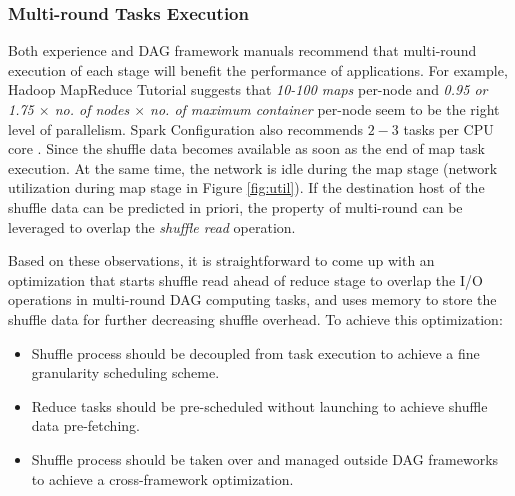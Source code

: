 \subsubsection{Multi-round Tasks Execution}\label{multi}
Both experience and DAG framework manuals recommend that multi-round execution of each stage will benefit the performance of applications.
For example, Hadoop MapReduce Tutorial \cite{hadooptutorial} suggests that \textit{10-100 maps} per-node and \textit{0.95 or 1.75 $\times$ no. of nodes $\times$ no. of maximum container} per-node seem to be the right level of parallelism. Spark Configuration also recommends $2-3$ tasks per CPU core \cite{sparkconf}.
Since the shuffle data becomes available as soon as the end of map task execution. At the same time, the network is idle during the map stage (network utilization during map stage in Figure \ref{fig:util}). If the destination host of the shuffle data can be predicted in priori, the property of multi-round can be leveraged to overlap the \textit{shuffle read} operation.

Based on these observations, it is straightforward to come up with an optimization that starts shuffle read ahead of reduce stage to overlap the I/O operations in multi-round DAG computing tasks, and uses memory to store the shuffle data for further decreasing shuffle overhead. To achieve this optimization:
\begin{itemize}
	\item Shuffle process should be decoupled from task execution to achieve a fine granularity scheduling scheme.
	\item Reduce tasks should be pre-scheduled without launching to achieve shuffle data pre-fetching.
	\item Shuffle process should be taken over and managed outside DAG frameworks to achieve a cross-framework optimization.
\end{itemize}
